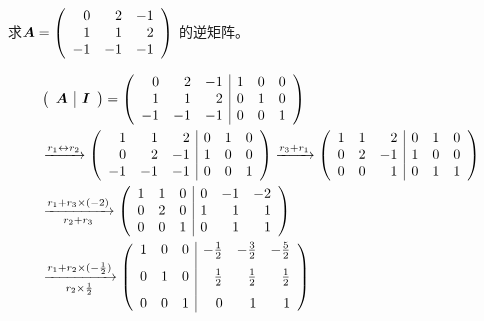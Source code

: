 \begin{li}
  求$
  \boldsymbol{A}=\left(
    \begin{array}{rrr}
      0&2&-1\\
      1&1&2\\
      -1&-1&-1
    \end{array}
  \right)
  $
  的逆矩阵。
\end{li}




\begin{jie}

$$
\begin{aligned}
&\left(
  \begin{array}{c|c}
    \boldsymbol{A} & \boldsymbol{I}
  \end{array}
\right)=\left(
  \begin{array}{rrr|rrr}
    0 &  2 & -1 &  1 & 0 & 0\\
    1 &  1 &  2 &  0 & 1 & 0\\
    -1 & -1 & -1 &  0 & 0 & 1\\              
  \end{array}
\right) \\ 
&\xrightarrow[]{r_1\leftrightarrow r_2}\left(
  \begin{array}{rrr|rrr}
    1 &  1 &  2 &  0 & 1 & 0\\
    0 &  2 & -1 &  1 & 0 & 0\\
    -1 & -1 & -1 &  0 & 0 & 1\\          
  \end{array}
\right) 
\xrightarrow[]{r_3+ r_1}\left(
  \begin{array}{rrr|rrr}
    1 &  1 &  2 & 0 & 1 & 0\\
    0 &  2 & -1 & 1 & 0 & 0\\
    0 &  0 &  1 & 0 & 1 & 1\\          
  \end{array}
\right)\\
&\xrightarrow[r_2+r_3]{r_1+ r_3\times(-2)}\left(
  \begin{array}{rrr|rrr}
    1 &  1 &  0  & 0 &-1 &-2\\
    0 &  2 &  0  & 1 & 1 & 1\\
    0 &  0 &  1  & 0 & 1 & 1\\    
  \end{array}
\right)\\
&\xrightarrow[r_2\times \frac12]{r_1+ r_2\times(-\frac12)}\left(
  \begin{array}{rrr|rrr}
    1 &  0 &  0  & -\frac12 &-\frac32 &-\frac52\\[.1in]
    0 &  1 &  0  & \frac12 & \frac12 & \frac12 \\[.1in]
    0 &  0 &  1  & 0 & 1 & 1                   
  \end{array}
\right)    
\end{aligned}
$$
\end{jie}




